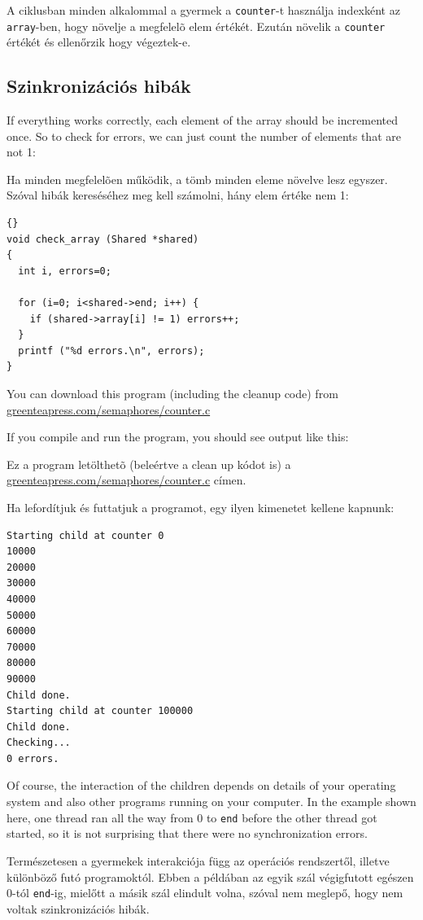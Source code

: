 \documentclass{book}
\begin{document}
A ciklusban minden alkalommal a gyermek a {\tt counter}-t
használja indexként az {\tt array}-ben, hogy növelje a
megfelelõ elem értékét. Ezután növelik a {\tt counter} értékét
és ellenőrzik hogy végeztek-e.

\subsection{Szinkronizációs hibák}

If everything works correctly, each element of the array should be
incremented once.  So to check for errors, we can just count the
number of elements that are not 1:

Ha minden megfelelõen működik, a tömb minden eleme növelve lesz egyszer.
Szóval hibák kereséséhez meg kell számolni, hány elem értéke nem 1:

\begin{lstlisting}[title={}]{}
void check_array (Shared *shared)
{
  int i, errors=0;

  for (i=0; i<shared->end; i++) {
    if (shared->array[i] != 1) errors++;
  }
  printf ("%d errors.\n", errors);
}
\end{lstlisting}

You can download this program (including the cleanup code) from
\url{greenteapress.com/semaphores/counter.c}

If you compile and run the program, you should see output like this:

Ez a program letölthetõ (beleértve a clean up kódot is) a
\url{greenteapress.com/semaphores/counter.c} címen.

Ha lefordítjuk és futtatjuk a programot, egy ilyen kimenetet kellene kapnunk:

\begin{verbatim}
Starting child at counter 0
10000
20000
30000
40000
50000
60000
70000
80000
90000
Child done.
Starting child at counter 100000
Child done.
Checking...
0 errors.
\end{verbatim}

Of course, the interaction of the children depends on details
of your operating system and also other programs running on your
computer.  In the example shown here, one thread ran all the way
from 0 to {\tt end} before the other thread got started, so it is
not surprising that there were no synchronization errors.

Természetesen a gyermekek interakciója függ az operációs
rendszertől, illetve különböző futó programoktól.
Ebben a példában az egyik szál végigfutott egészen 0-tól {\tt end}-ig,
mielőtt a másik szál elindult volna,
szóval nem meglepő, hogy nem voltak szinkronizációs hibák.
\end{document}
